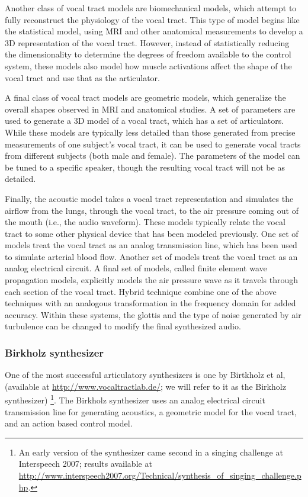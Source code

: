 \documentclass{article}
\begin{document}
Another class of vocal tract models
are biomechanical models,
which attempt to fully reconstruct
the physiology of the vocal tract.
This type of model begins
like the statistical model,
using MRI and other anatomical measurements
to develop a 3D representation
of the vocal tract.
However, instead of statistically
reducing the dimensionality
to determine the degrees of freedom
available to the control system,
these models also model how
muscle activations affect the shape
of the vocal tract
and use that as the articulator.

A final class of vocal tract models
are geometric models,
which generalize the overall
shapes observed in
MRI and anatomical studies.
A set of parameters
are used to generate a 3D model
of a vocal tract,
which has a set of articulators.
While these models are typically
less detailed than those
generated from precise
measurements of one subject's vocal tract,
it can be used to generate vocal tracts
from different subjects
(both male and female).
The parameters of the model
can be tuned to a specific speaker,
though the resulting vocal tract
will not be as detailed.

Finally, the acoustic model takes
a vocal tract representation
and simulates the airflow from
the lungs, through the vocal tract,
to the air pressure coming out
of the mouth (i.e., the audio waveform).
These models typically relate
the vocal tract to some other physical
device that has been modeled previously.
One set of models treat the vocal tract
as an analog transmission line,
which has been used to
simulate arterial blood flow.
Another set of models treat the vocal tract
as an analog electrical circuit.
A final set of models,
called finite element wave propagation models,
explicitly models the air pressure wave
as it travels through each section
of the vocal tract.
Hybrid technique combine one
of the above techniques
with an analogous transformation
in the frequency domain for added accuracy.
Within these systems, the glottis
and the type of noise generated
by air turbulence can be changed
to modify the final synthesized audio.

\subsubsection{Birkholz synthesizer}

One of the most successful articulatory synthesizers
is one by Birtkholz et al,
(available at \url{http://www.vocaltractlab.de/};
we will refer to it as the Birkholz synthesizer)%
\footnote{An early version of the synthesizer
came second in a singing challenge
at Interspeech 2007; results available at
\url{http://www.interspeech2007.org/Technical/synthesis_of_singing_challenge.php}.}.
The Birkholz synthesizer uses
an analog electrical circuit transmission line
for generating acoustics,
a geometric model for the vocal tract,
and an action based control model.
\end{document}
